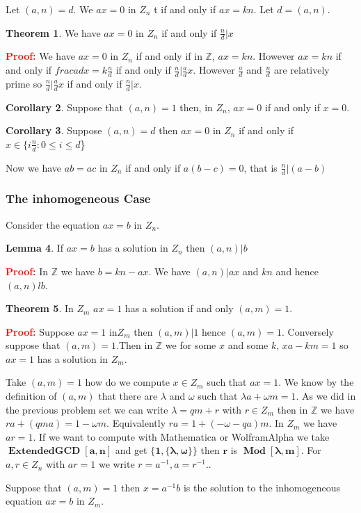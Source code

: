 \documentclass[12pt]{amsart}
\theoremstyle{definition}
\newtheorem{theorem}{Theorem}
\newcommand{\bet}{\begin{theorem}}
\newcommand{\et}{\end{theorem}}
\newtheorem{lemma}[theorem]{Lemma}
\newcommand{\bel}{\begin{lemma}}
\newcommand{\el}{\end{lemma}}
\newtheorem{corollary}[theorem]{Corollary}
\newcommand{\bec}{\begin{corollary}}
\newcommand{\ec}{\end{corollary}}
\newcommand{\pru}{{ \bfseries \textcolor{red}{Proof:} }}
\newcommand{\mbZ}{\mathbb{Z}}
\DeclareMathOperator{\ExtendedGCD}{ExtendedGCD}
\DeclareMathOperator{\Mod}{Mod}
\begin{document}
Let $(a,n)=d$. We $ax=0$ in $Z_n$ t if and only if  $ax=kn$. Let $d=(a,n)$.
\bet We have $ax=0$ in $Z_n$  if and only if $\frac{n}{d}|x$
\et

\pru We have $ax=0$ in $Z_n$  if and only if in $\mbZ$, $ax=kn$. However $ax=kn$ if and only if $frac{a}{d}x=k\frac{n}{d}$ if and only if $\frac{n}{d}|\frac{a}{d}x$. However $\frac{a}{d}$ and $\frac{n}{d}$ are relatively prime so $\frac{n}{d}|\frac{a}{d}x$ if and only if $\frac{n}{d}|x$.
\bec Suppose that $(a,n)=1$ then, in $Z_n$, $ax=0$ if and only if $x=0$.
\ec

\bec Suppose $(a,n)=d$ then $ax=0$ in $Z_n$ if and only if $x\in \{i\frac{n}{d}: 0\leq i\leq d$\}
\ec
Now we have $ab=ac$ in $Z_n$ if and only if $a(b-c)=0$, that is $\frac{n}{d}|(a-b)$

\subsubsection{The inhomogeneous Case}
Consider the equation $ax=b$ in $Z_n$.
\bel \label{existssol}  If $ax=b$ has a solution in $Z_n$ then $(a,n)|b$
\el

\pru In $\mbZ$ we have $b=kn-ax$. We have $(a,n)|ax$ and $kn$ and hence $(a,n)lb$.
\bet In $Z_m$ $ax=1$ has a solution if and only $(a,m)=1$. 
\et

\pru Suppose $ax=1$ in$Z_m$ then $(a,m)|1$ hence $(a,m)=1$. Conversely suppose that $(a,m)=1$.Then in $\mbZ$ we for some $x$ and some $k$, $xa-km=1$ so $ax=1$ has a solution in $Z_m$.

Take  $(a,m)=1$ how do we compute $x\in Z_m$ such that $ax=1$. We know by the definition of $(a,m)$ that there are $\lambda$ and $\omega$ such that $\lambda a+\omega m=1$. As we did in the previous problem set we can write 
$\lambda=qm+r$ with $r\in Z_m$ then in $\mbZ$ we have $ra+(qma)=1-\omega m$. Equivalently  $ra=1+(-\omega-qa)m$. In $Z_m$ we have $ar=1$. If we want to compute with Mathematica or WolframAlpha we take  $\bm{\ExtendedGCD[a,n]}$ and get $\bm{\{1,\{\lambda,\omega\}\}}$ then $\bm{r}$ is $\bm{\Mod[\lambda,m]}$.  For $a,r\in Z_n$ with $ar=1$ we write $r=a^{-1},a=r^{-1}$..

Suppose that $(a,m)=1$ then $x=a^{-1}b$ is the solution to the inhomogeneous equation $ax=b$ in $Z_m$.
\end{document}
